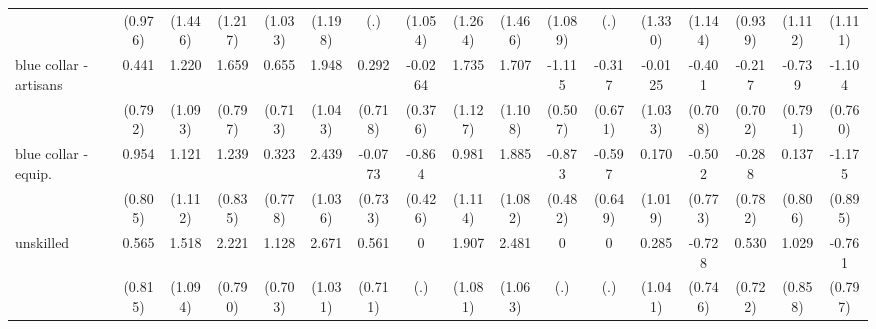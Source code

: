 {\begin{tabular}{l*{16}{c}}
                    &     (0.976)         &     (1.446)         &     (1.217)         &     (1.033)         &     (1.198)         &         (.)         &     (1.054)         &     (1.264)         &     (1.466)         &     (1.089)         &         (.)         &     (1.330)         &     (1.144)         &     (0.939)         &     (1.112)         &     (1.111)         \\
[1em]
blue collar - artisans&       0.441         &       1.220         &       1.659\sym{*}  &       0.655         &       1.948         &       0.292         &     -0.0264         &       1.735         &       1.707         &      -1.115\sym{*}  &      -0.317         &     -0.0125         &      -0.401         &      -0.217         &      -0.739         &      -1.104         \\
                    &     (0.792)         &     (1.093)         &     (0.797)         &     (0.713)         &     (1.043)         &     (0.718)         &     (0.376)         &     (1.127)         &     (1.108)         &     (0.507)         &     (0.671)         &     (1.033)         &     (0.708)         &     (0.702)         &     (0.791)         &     (0.760)         \\
[1em]
blue collar - equip.&       0.954         &       1.121         &       1.239         &       0.323         &       2.439\sym{*}  &     -0.0773         &      -0.864\sym{*}  &       0.981         &       1.885         &      -0.873         &      -0.597         &       0.170         &      -0.502         &      -0.288         &       0.137         &      -1.175         \\
                    &     (0.805)         &     (1.112)         &     (0.835)         &     (0.778)         &     (1.036)         &     (0.733)         &     (0.426)         &     (1.114)         &     (1.082)         &     (0.482)         &     (0.649)         &     (1.019)         &     (0.773)         &     (0.782)         &     (0.806)         &     (0.895)         \\
[1em]
unskilled           &       0.565         &       1.518         &       2.221\sym{**} &       1.128         &       2.671\sym{**} &       0.561         &           0         &       1.907         &       2.481\sym{*}  &           0         &           0         &       0.285         &      -0.728         &       0.530         &       1.029         &      -0.761         \\
                    &     (0.815)         &     (1.094)         &     (0.790)         &     (0.703)         &     (1.031)         &     (0.711)         &         (.)         &     (1.081)         &     (1.063)         &         (.)         &         (.)         &     (1.041)         &     (0.746)         &     (0.722)         &     (0.858)         &     (0.797)         \\

\end{tabular}}
